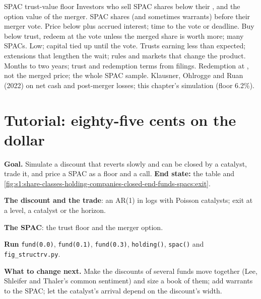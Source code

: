 \begin{strategyfile}{SPAC trust-value floor}\label{strat:s1:share-classes-holding-companies-closed-end-funds-spacs:spac}
 Investors who sell SPAC shares below their , and the option value of the merger.
 SPAC shares (and sometimes warrants) before their merger vote.
 Price below  plus accrued interest; time to the vote or deadline.
 Buy below trust, redeem at the vote unless the merged share is worth more; many SPACs.
 Low; capital tied up until the vote.
 Trusts earning less than expected; extensions that lengthen the wait; rules and markets that change the product.
 Months to two years; trust and redemption terms from filings.
 Redemption at , not the merged price; the whole SPAC sample.
 Klausner, Ohlrogge and Ruan (2022) on net cash and post-merger losses; this chapter's simulation (floor 6.2\%).
\end{strategyfile}

\section{Tutorial: eighty-five cents on the dollar}\label{tut:s1:share-classes-holding-companies-closed-end-funds-spacs:tut}

\begin{tutorial}
\textbf{Goal.} Simulate a discount that reverts slowly and can be closed by a catalyst, trade it, and price a SPAC as a floor and a call. \textbf{End state:}
the table and \cref{fig:s1:share-classes-holding-companies-closed-end-funds-spacs:exit}.
\begin{tutsteps}
\item \textbf{The discount and the trade}: an AR(1) in logs with Poisson catalysts; exit at a level, a catalyst or the horizon.
\label{lst:s1:share-classes-holding-companies-closed-end-funds-spacs:discount}
\item \textbf{The SPAC}: the trust floor and the merger option.
\label{lst:s1:share-classes-holding-companies-closed-end-funds-spacs:spac}
\item \textbf{Run} \texttt{fund(0.0)}, \texttt{fund(0.1)}, \texttt{fund(0.3)}, \texttt{holding()}, \texttt{spac()} and \texttt{fig\_structrv.py}.
\end{tutsteps}
\textbf{What to change next.} Make the discounts of several funds move together (Lee, Shleifer and Thaler's common sentiment) and size a book of them; add
warrants to the SPAC; let the catalyst's arrival depend on the discount's width.
\end{tutorial}

